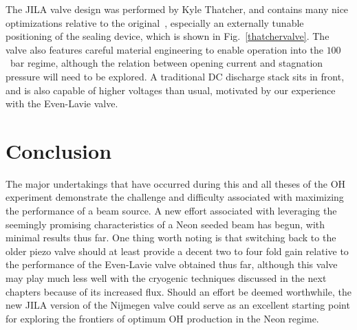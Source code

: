 The JILA valve design was performed by Kyle Thatcher, and contains many nice optimizations relative to the original~\cite{Yan2013}, especially an externally tunable positioning of the sealing device, which is shown in Fig.~\ref{thatchervalve}.
The valve also features careful material engineering to enable operation into the $100$~bar regime, although the relation between opening current and stagnation pressure will need to be explored.
A traditional DC discharge stack sits in front, and is also capable of higher voltages than usual, motivated by our experience with the Even-Lavie valve.

\section{Conclusion}

The major undertakings that have occurred during this and all theses of the OH experiment demonstrate the challenge and difficulty associated with maximizing the performance of a beam source.
A new effort associated with leveraging the seemingly promising characteristics of a Neon seeded beam has begun, with minimal results thus far.
One thing worth noting is that switching back to the older piezo valve should at least provide a decent two to four fold gain relative to the performance of the Even-Lavie valve obtained thus far, although this valve may play much less well with the cryogenic techniques discussed in the next chapters because of its increased flux.
Should an effort be deemed worthwhile, the new JILA version of the Nijmegen valve could serve as an excellent starting point for exploring the frontiers of optimum OH production in the Neon regime.


\ifx\justbeingincluded\undefined

\fi
